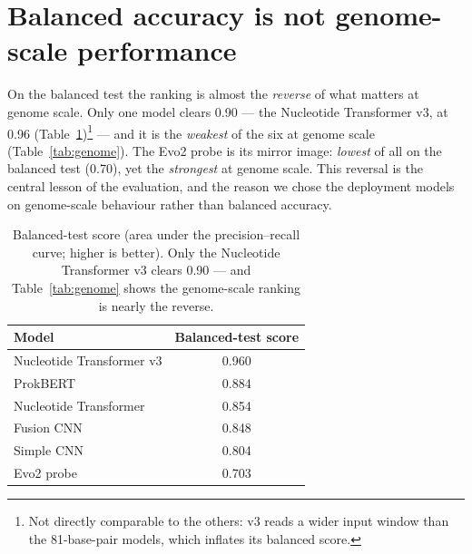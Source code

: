 \documentclass{article}
\begin{document}
\section{Balanced accuracy is not genome-scale performance}
On the balanced test the ranking is almost the \emph{reverse} of what matters at genome scale. Only one
model clears 0.90 --- the Nucleotide Transformer v3, at 0.96 (Table~\ref{tab:balanced})\footnote{Not
directly comparable to the others: v3 reads a wider input window than the 81-base-pair models, which
inflates its balanced score.} --- and it is the \emph{weakest} of the six at genome scale
(Table~\ref{tab:genome}). The Evo2 probe is its mirror image: \emph{lowest} of all on the balanced test
(0.70), yet the \emph{strongest} at genome scale. This reversal is the central lesson of the evaluation,
and the reason we chose the deployment models on genome-scale behaviour rather than balanced accuracy.

\begin{table}[h]
\centering
\caption{Balanced-test score (area under the precision--recall curve; higher is better). Only the
Nucleotide Transformer v3 clears 0.90 --- and Table~\ref{tab:genome} shows the genome-scale ranking is
nearly the reverse.}
\label{tab:balanced}
\begin{tabular}{lc}
\toprule
Model & Balanced-test score \\
\midrule
Nucleotide Transformer v3 & 0.960 \\
ProkBERT                  & 0.884 \\
Nucleotide Transformer    & 0.854 \\
Fusion CNN                & 0.848 \\
Simple CNN                & 0.804 \\
Evo2 probe                & 0.703 \\
\bottomrule
\end{tabular}
\end{table}
\end{document}
